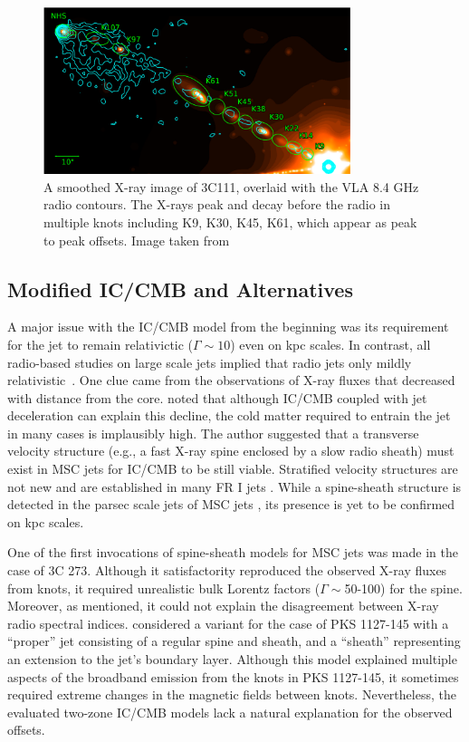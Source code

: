 \begin{figure}
    \centering
    \includegraphics[width=0.8\textwidth]{images/sources/3c111.png}
    \caption{A smoothed X-ray image of 3C111, overlaid with the VLA 8.4 GHz radio contours. The X-rays peak and decay before the radio in multiple knots including K9, K30, K45, K61, which appear as peak to peak offsets. Image taken from \citet{Clautice:2016zai}}
    \label{fig:3C111}
\end{figure}

\subsection{Modified IC/CMB and Alternatives}
A major issue with the IC/CMB model from the beginning was its requirement for the jet to remain relativictic  ($\Gamma\sim10$) even on kpc scales. In contrast, all radio-based studies on large scale jets implied that radio jets only mildly relativistic~\citep[$\Gamma\lesssim 1.5$, e.g., ][]{wardle1997fast,mullin2009bayesian}. One clue came from the observations of X-ray fluxes that decreased with distance from the core. \citet{hardcastle2006testing} noted that although IC/CMB coupled with jet deceleration can explain this decline, the cold matter required to entrain the jet in many cases is implausibly high. The author suggested that a transverse velocity structure (e.g., a fast X-ray spine enclosed by a slow radio sheath) must exist in MSC jets for IC/CMB to be still viable. Stratified velocity structures are not new and are established in many FR I jets \citep[e.g.,][]{laing2004adiabatic,canvin2004relativistic}. While a spine-sheath structure is detected in the parsec scale jets of MSC jets \citep[e.g.,][]{2021A&A...654A..27B}, its presence is yet to be confirmed on kpc scales.

One of the first invocations of spine-sheath models for MSC jets was made in the case of 3C 273. Although it satisfactority reproduced the observed X-ray fluxes from knots, it required unrealistic bulk Lorentz factors ($\Gamma\sim $50-100) for the spine. Moreover, as mentioned, it could not explain the disagreement between X-ray radio spectral indices. \citet{siemiginowska2007300} considered a variant for the case of PKS 1127-145 with a ``proper'' jet consisting of a regular spine and sheath, and a ``sheath'' representing an extension to the jet's boundary layer. Although this model explained multiple aspects of the broadband emission from the knots in PKS 1127-145, it sometimes required extreme changes in the magnetic fields between knots. Nevertheless, the evaluated two-zone IC/CMB models lack a natural explanation for the observed offsets.

